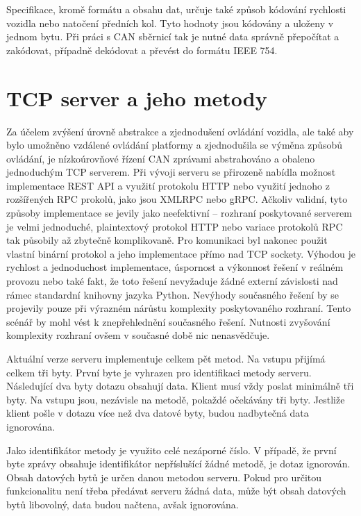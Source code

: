 \documentclass[czech, bachelor]{diploma}
\begin{document}
Specifikace, kromě formátu a obsahu dat, určuje také způsob kódování rychlosti vozidla nebo natočení předních kol. Tyto hodnoty
jsou kódovány a uloženy v jednom bytu. Při práci s CAN sběrnicí tak je nutné data správně přepočítat a zakódovat, případně
dekódovat a převést do formátu IEEE 754\cite{floating-point-source}.

\section{TCP server a jeho metody} \label{server-methods}

Za účelem zvýšení úrovně abstrakce a zjednodušení ovládání vozidla, ale také aby bylo umožněno vzdálené ovládání platformy
a zjednodušila se výměna způsobů ovládání, je nízkoúrovňové řízení CAN zprávami abstrahováno a obaleno jednoduchým TCP serverem.
Při vývoji serveru se přirozeně nabídla možnost implementace REST API\cite{rest-source} a využití protokolu HTTP\cite{
http-source} nebo využití jednoho z rozšířených RPC prokolů, jako jsou XMLRPC\cite{xmlrpc-source} nebo gRPC\cite{grpc-source}.
Ačkoliv validní, tyto způsoby implementace se jevily jako neefektivní -- rozhraní poskytované serverem je velmi jednoduché,
plaintextový protokol HTTP nebo variace protokolů RPC tak působily až zbytečně komplikovaně. Pro komunikaci byl nakonec použit
vlastní binární protokol a jeho implementace přímo nad TCP sockety. Výhodou je rychlost a jednoduchost implementace, úspornost
a výkonnost řešení v reálném provozu nebo také fakt, že toto řešení nevyžaduje žádné externí závislosti nad rámec standardní
knihovny jazyka Python. Nevýhody současného řešení by se projevily pouze při výrazném nárůstu komplexity poskytovaného rozhraní.
Tento scénář by mohl vést k znepřehlednění současného řešení. Nutnosti zvyšování komplexity rozhraní ovšem v současné době nic
nenasvědčuje.

Aktuální verze serveru implementuje celkem pět metod. Na vstupu přijímá celkem tři byty. První byte je vyhrazen pro identifikaci
metody serveru. Následující dva byty dotazu obsahují data. Klient musí vždy poslat minimálně tři byty. Na vstupu jsou, nezávisle
na metodě, pokaždé očekávány tři byty. Jestliže klient pošle v dotazu více než dva datové byty, budou nadbytečná data ignorována.

Jako identifikátor metody je využito celé nezáporné číslo. V případě, že první byte zprávy obsahuje identifikátor nepříslušící
žádné metodě, je dotaz ignorován. Obsah datových bytů je určen danou metodou serveru. Pokud pro určitou funkcionalitu není třeba
předávat serveru žádná data, může být obsah datových bytů libovolný, data budou načtena, avšak ignorována.
\end{document}
